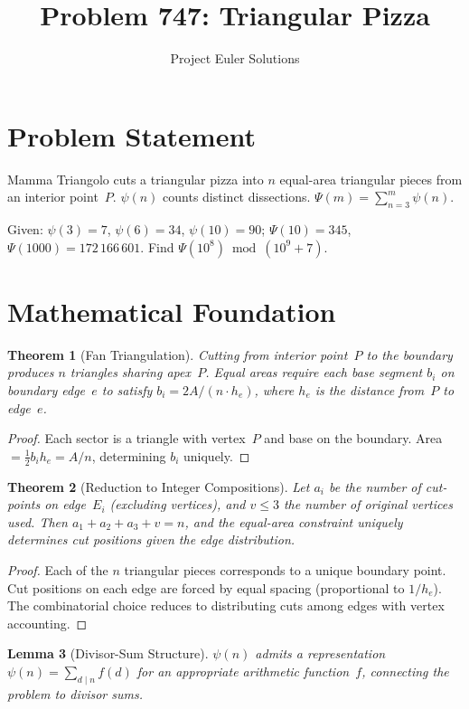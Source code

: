 \documentclass[11pt]{article}
\title{Problem 747: Triangular Pizza}
\author{Project Euler Solutions}
\date{}
\newtheorem{theorem}{Theorem}
\newtheorem{lemma}[theorem]{Lemma}
\theoremstyle{definition}
\begin{document}
\maketitle

\section{Problem Statement}

Mamma Triangolo cuts a triangular pizza into $n$ equal-area triangular pieces from an interior point~$P$. $\psi(n)$ counts distinct dissections. $\Psi(m) = \sum_{n=3}^{m}\psi(n)$.

Given: $\psi(3)=7$, $\psi(6)=34$, $\psi(10)=90$; $\Psi(10)=345$, $\Psi(1000)=172\,166\,601$. Find $\Psi(10^8) \bmod (10^9+7)$.

\section{Mathematical Foundation}

\begin{theorem}[Fan Triangulation]
Cutting from interior point~$P$ to the boundary produces $n$ triangles sharing apex~$P$. Equal areas require each base segment $b_i$ on boundary edge~$e$ to satisfy $b_i = 2A/(n\cdot h_e)$, where $h_e$ is the distance from~$P$ to edge~$e$.
\end{theorem}

\begin{proof}
Each sector is a triangle with vertex~$P$ and base on the boundary. Area $= \tfrac{1}{2}b_i h_e = A/n$, determining $b_i$ uniquely.
\end{proof}

\begin{theorem}[Reduction to Integer Compositions]
Let $a_i$ be the number of cut-points on edge~$E_i$ (excluding vertices), and $v \le 3$ the number of original vertices used. Then $a_1 + a_2 + a_3 + v = n$, and the equal-area constraint uniquely determines cut positions given the edge distribution.
\end{theorem}

\begin{proof}
Each of the $n$ triangular pieces corresponds to a unique boundary point. Cut positions on each edge are forced by equal spacing (proportional to $1/h_e$). The combinatorial choice reduces to distributing cuts among edges with vertex accounting.
\end{proof}

\begin{lemma}[Divisor-Sum Structure]
$\psi(n)$ admits a representation $\psi(n) = \sum_{d \mid n} f(d)$ for an appropriate arithmetic function~$f$, connecting the problem to divisor sums.
\end{lemma}
\end{document}
